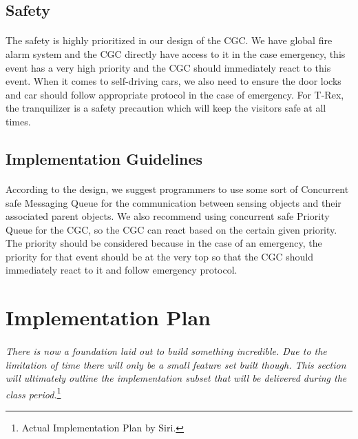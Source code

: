 \documentclass[12pt]{article}
\begin{document}
    \subsection{Safety}
    \paragraph{} The safety is highly prioritized in our design of the CGC. We have 
    global fire alarm system and the CGC directly have access to it in the case 
    emergency, this event has a very high priority and the CGC 
    should immediately react to this event. When it comes to self-driving cars, we also need to ensure the door locks
    and car should follow appropriate protocol in the case of emergency. For T-Rex, the tranquilizer is a safety precaution which will 
    keep the visitors safe at all times.

    \subsection{Implementation Guidelines}
    \paragraph{} According to the design, we suggest programmers to use some sort of 
    Concurrent safe Messaging Queue for the communication between sensing objects and 
    their associated parent objects. We also recommend using concurrent safe Priority 
    Queue for the CGC, so the CGC can react based on the certain given priority. The 
    priority should be considered because in the case of an emergency, the priority 
    for that event should be at the very top so that the CGC should immediately react 
    to it and follow emergency protocol.

\section{Implementation Plan} \label{impl}
\paragraph{} \textit{There is now a foundation laid out to build something incredible. 
Due to the limitation of time there will only be a small feature set built though. This section will 
ultimately outline the implementation subset that will be delivered during the class period.}\footnote{ Actual Implementation Plan by Siri.}
\end{document}

